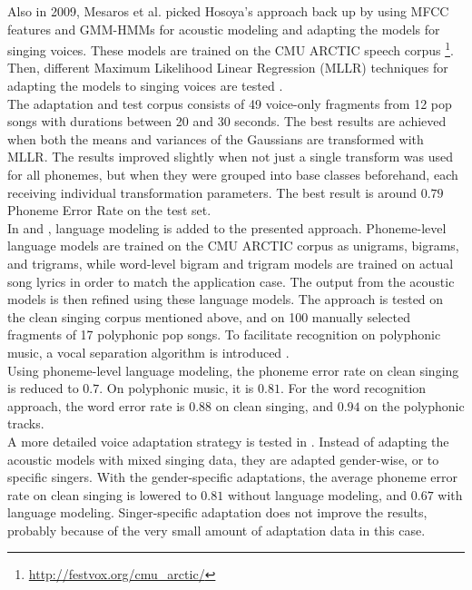 Also in 2009, Mesaros et al. picked Hosoya's approach back up by using MFCC features and GMM-HMMs for acoustic modeling \cite{Mesaros2009} and adapting the models for singing voices. These models are trained on the CMU ARCTIC speech corpus \footnote{\url{http://festvox.org/cmu_arctic/}}. Then, different Maximum Likelihood Linear Regression (MLLR) techniques for adapting the models to singing voices are tested \cite{mllr}.\\
The adaptation and test corpus consists of 49 voice-only fragments from 12 pop songs with durations between 20 and 30 seconds. The best results are achieved when both the means and variances of the Gaussians are transformed with MLLR. The results improved slightly when not just a single transform was used for all phonemes, but when they were grouped into base classes beforehand, each receiving individual transformation parameters. The best result is around $0.79$ Phoneme Error Rate on the test set.\\
In \cite{Mesaros2010} and \cite{Mesaros2011}, language modeling is added to the presented approach. Phoneme-level language models are trained on the CMU ARCTIC corpus as unigrams, bigrams, and trigrams, while word-level bigram and trigram models are trained on actual song lyrics in order to match the application case. The output from the acoustic models is then refined using these language models. The approach is tested on the clean singing corpus mentioned above, and on 100 manually selected fragments of 17 polyphonic pop songs. To facilitate recognition on polyphonic music, a vocal separation algorithm is introduced \cite{virtanen_separation}.\\
Using phoneme-level language modeling, the phoneme error rate on clean singing is reduced to $0.7$. On polyphonic music, it is $0.81$. For the word recognition approach, the word error rate is $0.88$ on clean singing, and $0.94$ on the polyphonic tracks.\\
A more detailed voice adaptation strategy is tested in \cite{mesaros2}. Instead of adapting the acoustic models with mixed singing data, they are adapted gender-wise, or to specific singers. With the gender-specific adaptations, the average phoneme error rate on clean singing is lowered to $0.81$ without language modeling, and $0.67$ with language modeling. Singer-specific adaptation does not improve the results, probably because of the very small amount of adaptation data in this case.\\
